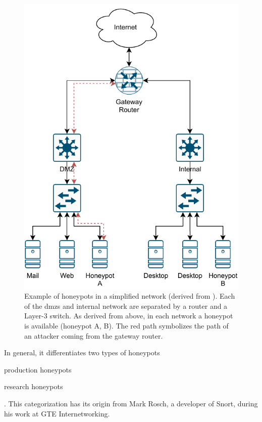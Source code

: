 \begin{figure}[ht]
    \centering
    \includegraphics{figures/honeypot-example.pdf}
    \caption[Example of honeypots in a simplified network]{
        Example of honeypots in a simplified network (derived from \cite{Spitzner2003}).
        Each of the \acp{dmz} and internal network are separated by a router and a Layer-3 switch.
        As derived from above, in each network a honeypot is available (honeypot A, B).
        The red path symbolizes the path of an attacker coming from the gateway router.
    }
    \label{fig:honeypot-example}
\end{figure}

In general, it differentiates two types of honeypots
\begin{enumerate*}[label=(\roman*)]
    \item production honeypots
    \item research honeypots
\end{enumerate*}.
This categorization has its origin from Mark Rosch, a developer of Snort, during his work at GTE Internetworking. \cite{vetterl2020}

